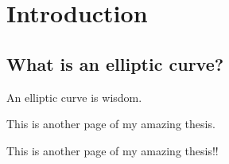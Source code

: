 \chapter{Introduction}%
\label{sec:introduction}

\section{What is an elliptic curve?}

An elliptic curve is wisdom. ~\cite{hank}

\pagebreak

This is another page of my amazing thesis.

\pagebreak

This is another page of my amazing thesis!!
